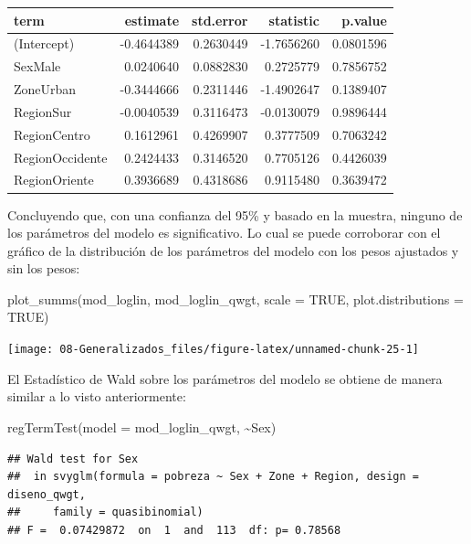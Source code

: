 \documentclass[
  12pt,
]{book}
\newenvironment{Shaded}{\begin{snugshade}}{\end{snugshade}}
\newcommand{\AttributeTok}[1]{\textcolor[rgb]{0.77,0.63,0.00}{#1}}
\newcommand{\ConstantTok}[1]{\textcolor[rgb]{0.00,0.00,0.00}{#1}}
\newcommand{\FunctionTok}[1]{\textcolor[rgb]{0.00,0.00,0.00}{#1}}
\newcommand{\NormalTok}[1]{#1}
\newcommand{\SpecialCharTok}[1]{\textcolor[rgb]{0.00,0.00,0.00}{#1}}
\begin{document}
\begin{tabular}{l|r|r|r|r}
\hline
term & estimate & std.error & statistic & p.value\\
\hline
(Intercept) & -0.4644389 & 0.2630449 & -1.7656260 & 0.0801596\\
\hline
SexMale & 0.0240640 & 0.0882830 & 0.2725779 & 0.7856752\\
\hline
ZoneUrban & -0.3444666 & 0.2311446 & -1.4902647 & 0.1389407\\
\hline
RegionSur & -0.0040539 & 0.3116473 & -0.0130079 & 0.9896444\\
\hline
RegionCentro & 0.1612961 & 0.4269907 & 0.3777509 & 0.7063242\\
\hline
RegionOccidente & 0.2424433 & 0.3146520 & 0.7705126 & 0.4426039\\
\hline
RegionOriente & 0.3936689 & 0.4318686 & 0.9115480 & 0.3639472\\
\hline
\end{tabular}

Concluyendo que, con una confianza del 95\% y basado en la muestra, ninguno de los parámetros del modelo es significativo. Lo cual se puede corroborar con el gráfico de la distribución de los parámetros del modelo con los pesos ajustados y sin los pesos:

\begin{Shaded}
\begin{Highlighting}[]
\FunctionTok{plot\_summs}\NormalTok{(mod\_loglin, mod\_loglin\_qwgt, }
             \AttributeTok{scale =} \ConstantTok{TRUE}\NormalTok{, }\AttributeTok{plot.distributions =} \ConstantTok{TRUE}\NormalTok{)}
\end{Highlighting}
\end{Shaded}

\texttt{[image: 08-Generalizados\_files/figure-latex/unnamed-chunk-25-1]}

El Estadístico de Wald sobre los parámetros del modelo se obtiene de manera similar a lo visto anteriormente:

\begin{Shaded}
\begin{Highlighting}[]
\FunctionTok{regTermTest}\NormalTok{(}\AttributeTok{model =}\NormalTok{ mod\_loglin\_qwgt, }\SpecialCharTok{\textasciitilde{}}\NormalTok{Sex)}
\end{Highlighting}
\end{Shaded}

\begin{verbatim}
## Wald test for Sex
##  in svyglm(formula = pobreza ~ Sex + Zone + Region, design = diseno_qwgt, 
##     family = quasibinomial)
## F =  0.07429872  on  1  and  113  df: p= 0.78568
\end{verbatim}
\end{document}
